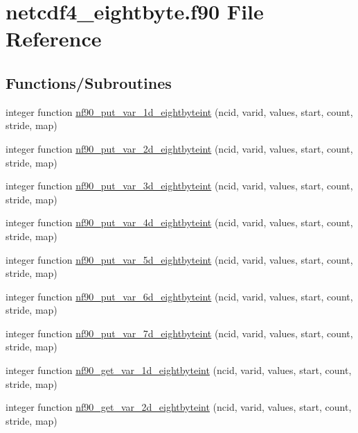 \hypertarget{netcdf4__eightbyte_8f90}{}\section{netcdf4\+\_\+eightbyte.\+f90 File Reference}
\label{netcdf4__eightbyte_8f90}
\subsection*{Functions/\+Subroutines}
\begin{DoxyCompactItemize}
\item 
integer function \hyperlink{netcdf4__eightbyte_8f90_a47c837921b0c4c1085340afa2908bd27}{nf90\+\_\+put\+\_\+var\+\_\+1d\+\_\+eightbyteint} (ncid, varid, values, start, count, stride, map)
\item 
integer function \hyperlink{netcdf4__eightbyte_8f90_a5f74fbc3c4b758731991344b922e79f9}{nf90\+\_\+put\+\_\+var\+\_\+2d\+\_\+eightbyteint} (ncid, varid, values, start, count, stride, map)
\item 
integer function \hyperlink{netcdf4__eightbyte_8f90_a8cc31a27809898ae558570386d71fd3c}{nf90\+\_\+put\+\_\+var\+\_\+3d\+\_\+eightbyteint} (ncid, varid, values, start, count, stride, map)
\item 
integer function \hyperlink{netcdf4__eightbyte_8f90_a2fcc7dafad70cffd89123ddbd491b3d0}{nf90\+\_\+put\+\_\+var\+\_\+4d\+\_\+eightbyteint} (ncid, varid, values, start, count, stride, map)
\item 
integer function \hyperlink{netcdf4__eightbyte_8f90_a7c70c2c6493acd29cd6e7ac1ce969b00}{nf90\+\_\+put\+\_\+var\+\_\+5d\+\_\+eightbyteint} (ncid, varid, values, start, count, stride, map)
\item 
integer function \hyperlink{netcdf4__eightbyte_8f90_a593864f2f5ed97b55185c8e459fc3760}{nf90\+\_\+put\+\_\+var\+\_\+6d\+\_\+eightbyteint} (ncid, varid, values, start, count, stride, map)
\item 
integer function \hyperlink{netcdf4__eightbyte_8f90_a51868f926ef0b973025994cd6c505ceb}{nf90\+\_\+put\+\_\+var\+\_\+7d\+\_\+eightbyteint} (ncid, varid, values, start, count, stride, map)
\item 
integer function \hyperlink{netcdf4__eightbyte_8f90_ac7f1c7b59c40bf98465096bf2de86167}{nf90\+\_\+get\+\_\+var\+\_\+1d\+\_\+eightbyteint} (ncid, varid, values, start, count, stride, map)
\item 
integer function \hyperlink{netcdf4__eightbyte_8f90_ac52730b7beb0dfd1e6350756edbd2168}{nf90\+\_\+get\+\_\+var\+\_\+2d\+\_\+eightbyteint} (ncid, varid, values, start, count, stride, map)

\end{DoxyCompactItemize}
